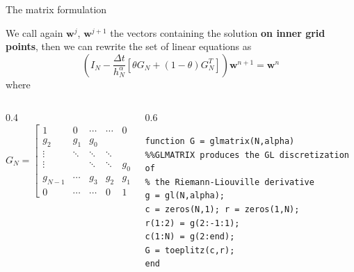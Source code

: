 \documentclass[aspectratio=169,xcolor=dvipsnames]{beamer}
\begin{document}
\begin{frame}[fragile]{The matrix formulation}

We call again $\mathbf{w}^{j}$, $\mathbf{w}^{j+1}$ the vectors containing the solution \textbf{on inner grid points}, then we can rewrite the set of linear equations as
\[
\left( I_N - \frac{\Delta t}{h_N^\alpha} \left[ \theta G_N + (1-\theta) G_N^T \right] \right) \mathbf{w}^{n+1} = \mathbf{w}^n
\]
where
\begin{columns}
\begin{column}{0.4\columnwidth}
\[
G_N = \begin{bmatrix}
	1 & 0 & \cdots & \cdots & 0 \\
	g_2 & g_1 & g_0 \\
	\vdots & \ddots & \ddots & \ddots\\
	\vdots &  & \ddots &  \ddots & g_0 \\
	g_{N-1} & \cdots & g_3 & g_2 & g_1 \\
	0 & \cdots & \cdots & 0 & 1
\end{bmatrix}
\]
\end{column}
\begin{column}{0.6\columnwidth}
\begin{verbatim}
function G = glmatrix(N,alpha)
%%GLMATRIX produces the GL discretization of  
% the Riemann-Liouville derivative
g = gl(N,alpha);
c = zeros(N,1); r = zeros(1,N);
r(1:2) = g(2:-1:1); 
c(1:N) = g(2:end);
G = toeplitz(c,r);
end
\end{verbatim}
\end{column}
\end{columns}
\end{frame}
\end{document}
